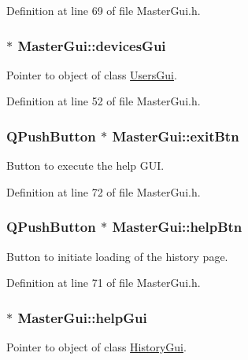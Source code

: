 Definition at line 69 of file Master\-Gui.\-h.

\hypertarget{class_master_gui_a2803cbba31ddd8200f1e80477b4adcf5}{
\subsubsection[{devices\-Gui}]{ $\ast$ Master\-Gui\-::devices\-Gui\hspace{0.3cm}{\ttfamily [private]}}}\label{class_master_gui_a2803cbba31ddd8200f1e80477b4adcf5}
Pointer to object of class \hyperlink{class_users_gui}{Users\-Gui}. 

Definition at line 52 of file Master\-Gui.\-h.

\hypertarget{class_master_gui_a4e0b56183c617fa1006c70bda4f01acb}{
\subsubsection[{exit\-Btn}]{\setlength{\rightskip}{0pt plus 5cm}Q\-Push\-Button $\ast$ Master\-Gui\-::exit\-Btn\hspace{0.3cm}{\ttfamily [private]}}}\label{class_master_gui_a4e0b56183c617fa1006c70bda4f01acb}
Button to execute the help G\-U\-I. 

Definition at line 72 of file Master\-Gui.\-h.

\hypertarget{class_master_gui_a59bf409f8bf08712d2579c6df986e486}{
\subsubsection[{help\-Btn}]{\setlength{\rightskip}{0pt plus 5cm}Q\-Push\-Button $\ast$ Master\-Gui\-::help\-Btn\hspace{0.3cm}{\ttfamily [private]}}}\label{class_master_gui_a59bf409f8bf08712d2579c6df986e486}
Button to initiate loading of the history page. 

Definition at line 71 of file Master\-Gui.\-h.

\hypertarget{class_master_gui_a79af6b544a8260562f4aad77b04dc2dc}{
\subsubsection[{help\-Gui}]{ $\ast$ Master\-Gui\-::help\-Gui\hspace{0.3cm}{\ttfamily [private]}}}\label{class_master_gui_a79af6b544a8260562f4aad77b04dc2dc}
Pointer to object of class \hyperlink{class_history_gui}{History\-Gui}. 

